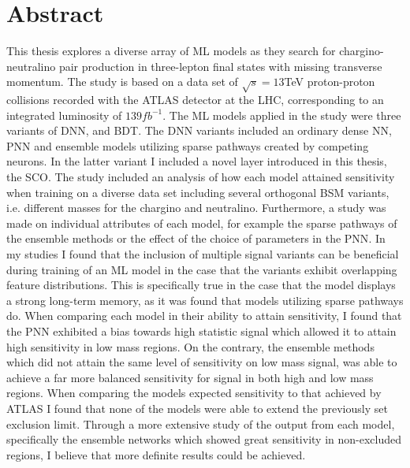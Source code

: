 \chapter*{Abstract} 
This thesis explores a diverse array of \acf{ML} models as they search for chargino-neutralino pair production in 
three-lepton final states with missing transverse momentum. The study is based on a data set of $\sqrt{s} = 13$TeV proton-proton
collisions recorded with the \acs{ATLAS} detector at the \acs{LHC}, corresponding to an integrated luminosity of $139 fb^{-1}$. The \acs{ML} 
models applied in the study were three variants of \acf{DNN}, and \acf{BDT}. The \acs{DNN} variants included an ordinary 
dense \acf{NN}, \acf{PNN} and ensemble models utilizing sparse pathways created by competing neurons. In the latter variant I 
included a novel layer introduced in this thesis, the \acf{SCO}. The study included an analysis of how each model attained sensitivity 
when training on a diverse data set including several orthogonal \acf{BSM} variants, i.e. different masses for the chargino and neutralino. 
Furthermore, a study was made on individual attributes of each model, for example the sparse pathways of the ensemble methods or the effect 
of the choice of parameters in the \acs{PNN}. In my studies I found that the inclusion of multiple signal variants can be beneficial during 
training of an \ac{ML} model in the case that the variants exhibit overlapping feature distributions. This is specifically true in 
the case that the model displays a strong long-term memory, as it was found that models utilizing sparse pathways do. When comparing each 
model in their ability to attain sensitivity, I found that the \acs{PNN} exhibited a bias towards high statistic signal which allowed it 
to attain high sensitivity in low mass regions. On the contrary, the ensemble methods which did not attain the same level of sensitivity 
on low mass signal, was able to achieve a far more balanced sensitivity for signal in both high and low mass regions. When comparing the 
models expected sensitivity to that achieved by \acs{ATLAS} I found that none of the models were able to extend the previously set exclusion limit.
Through a more extensive study of the output from each model, specifically the ensemble networks which showed great sensitivity in non-excluded 
regions, I believe that more definite results could be achieved. 
